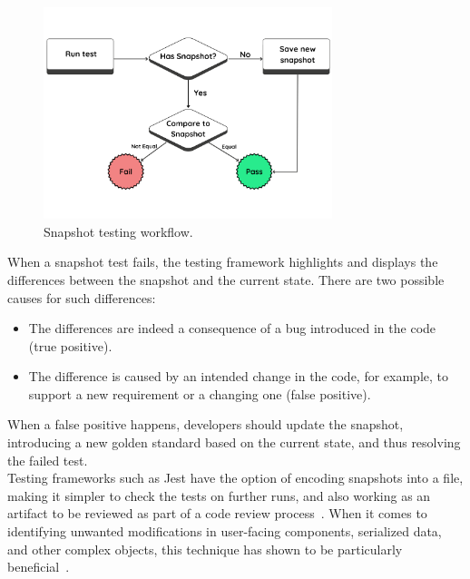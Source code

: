 \documentclass[
	msc, %
	english %
]{../ppgccufmg}
\begin{document}
        \begin{figure}[h]
            \centering
            \includegraphics[width=0.75\textwidth]{img/snapshot-test-workflow-2.png}
            \caption{Snapshot testing workflow.}
            \label{fig:snapshot-test-workflow}
        \end{figure}

    When a snapshot test fails, the testing framework highlights and displays the differences between the snapshot and the current state. There are two possible causes for such differences:
        
    \begin{itemize}
        \item The differences are indeed a consequence of a bug introduced in the code (true positive).
        \item The difference is caused by an intended change in the code, for example, to support a new requirement or a changing one (false positive).
    \end{itemize}

    When a false positive happens, developers should update the snapshot, introducing a new golden standard based on the current state, and thus resolving the failed test.\\
    
    Testing frameworks such as Jest have the option of encoding snapshots into a file, making it simpler to check the tests on further runs, and also working as an artifact to be reviewed as part of a code review process~\cite{Jest22}. When it comes to identifying unwanted modifications in user-facing components, serialized data, and other complex objects, this technique has shown to be particularly beneficial~\cite{osmani2018}.
\end{document}
